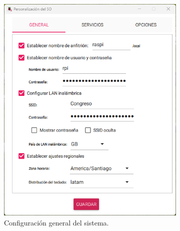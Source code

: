 \documentclass[12pt]{article}
\begin{document}
\begin{figure}[H]
    \centering
    \begin{subfigure}[b]{0.48\linewidth}
        \centering
        \includegraphics[width=\linewidth]{rpi_ajustes.png}
        \caption{Configuración general del sistema.}
        \label{fig:rpi_ajustes}
    \end{subfigure}
    \hfill
    \begin{subfigure}[b]{0.48\linewidth}
        \centering

\end{subfigure}
\end{figure}
\end{document}
